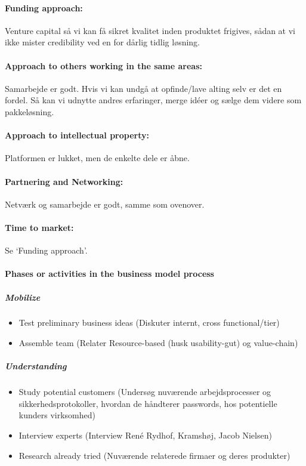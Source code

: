 \paragraph{Funding approach:} Venture capital så vi kan få sikret kvalitet inden produktet frigives, sådan at vi ikke mister credibility ved en for dårlig tidlig løsning.

\paragraph{Approach to others working in the same areas:} Samarbejde er godt.
Hvis vi kan undgå at opfinde/lave alting selv er det en fordel.
Så kan vi udnytte andres erfaringer, merge idéer og sælge dem videre som pakkeløsning.

\paragraph{Approach to intellectual property:} Platformen er lukket, men de enkelte dele er åbne.

\paragraph{Partnering and Networking:} Netværk og samarbejde er godt, samme som ovenover.

\paragraph{Time to market:} Se `Funding approach'.

\paragraph{Phases or activities in the business model process}

\subparagraph{Mobilize}
\begin{itemize}
\item Test preliminary business ideas (Diskuter internt, cross functional/tier)
\item Assemble team (Relater Resource-based (husk usability-gut) og value-chain)
\end{itemize}

\subparagraph{Understanding}
\begin{itemize}
\item Study potential customers (Undersøg nuværende arbejdsprocesser og sikkerhedsprotokoller, hvordan de håndterer passwords, hos potentielle kunders virksomhed)
\item Interview experts (Interview René Rydhof, Kramshøj, Jacob Nielsen)
\item Research already tried (Nuværende relaterede firmaer og deres produkter)
\end{itemize}

